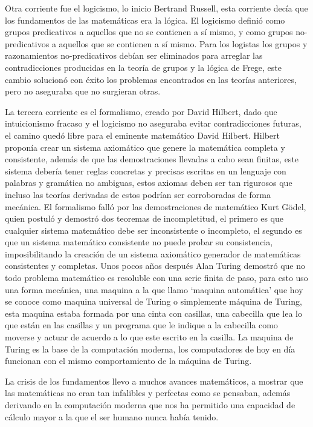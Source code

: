 \documentclass[letterpaper, 12pt]{article}
\begin{document}
Otra corriente fue el logicismo, lo inicio Bertrand Russell, esta corriente decía que los fundamentos de las matemáticas era la lógica. El logicismo definió como grupos predicativos a aquellos que no se contienen a sí mismo, y como grupos no-predicativos a aquellos que se contienen a sí mismo. Para los logistas los grupos y razonamientos no-predicativos debían ser eliminados para arreglar las contradicciones producidas en la teoría de grupos y la lógica de Frege, este cambio solucionó con éxito los problemas encontrados en las teorías anteriores, pero no aseguraba que no surgieran otras. 

La tercera corriente es el formalismo, creado por David Hilbert, dado que intuicionismo fracaso y el logicismo no aseguraba evitar contradicciones futuras, el camino quedó libre para el eminente matemático David Hilbert. Hilbert proponía crear un sistema axiomático que genere la matemática completa y consistente, además de que las demostraciones llevadas a cabo sean finitas, este sistema debería tener reglas concretas y precisas escritas en un lenguaje con palabras y gramática no ambiguas, estos axiomas deben ser tan rigurosos que incluso las teorías derivadas de estos podrían ser corroboradas de forma mecánica. El formalismo falló por las demostraciones de matemático Kurt Gödel, quien postuló y demostró dos teoremas de incompletitud, el primero es que cualquier sistema matemático debe ser inconsistente o incompleto, el segundo es que un sistema matemático consistente no puede probar su consistencia, imposibilitando la creación de un sistema axiomático generador de matemáticas consistentes y completas. Unos pocos años después Alan Turing demostró que no todo problema matemático es resoluble con una serie finita de paso, para esto uso una forma mecánica, una maquina a la que llamo ‘maquina automática’ que hoy se conoce como maquina universal de Turing o simplemente máquina de Turing, esta maquina estaba formada por una cinta con casillas, una cabecilla que lea lo que están en las casillas y un programa que le indique a la cabecilla como moverse y actuar de acuerdo a lo que este escrito en la casilla. La maquina de Turing es la base de la computación moderna, los computadores de hoy en día funcionan con el mismo comportamiento de la máquina de Turing.

La crisis de los fundamentos llevo a muchos avances matemáticos, a mostrar que las matemáticas no eran tan infalibles y perfectas como se pensaban, además derivando en la computación moderna que nos ha permitido una capacidad de cálculo mayor a la que el ser humano nunca había tenido. 
\end{document}
